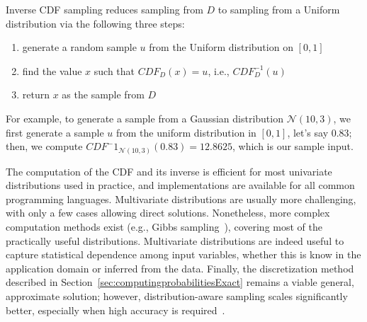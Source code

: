 Inverse CDF sampling reduces sampling from $D$ to sampling from a Uniform distribution via the following three steps:

\begin{enumerate}
	\item generate a random sample $u$ from the Uniform distribution on $[0,1]$
	\item find the value $x$ such that $CDF_D(x)=u$, i.e., $CDF_D^{-1}(u)$
	\item return $x$ as the sample from $D$
\end{enumerate}

For example, to generate a sample from a Gaussian distribution $\mathcal{N}(10, 3)$, we first generate a sample $u$ from the uniform distribution in $[0,1]$, let's say 0.83; then, we compute $CDF^-1_{\mathcal{N}(10,3)}(0.83)=12.8625$, which is our sample input.

The computation of the CDF and its inverse is efficient for most univariate distributions used in practice, and implementations are available for all common programming languages. Multivariate distributions are usually more challenging, with only a few cases allowing direct solutions. Nonetheless, more complex computation methods exist (e.g., Gibbs sampling~\cite{Robert2005MCBook}), covering most of the practically useful distributions. Multivariate distributions are indeed useful to capture statistical dependence among input variables, whether this is know in the application domain or inferred from the data. Finally, the discretization method described in Section~\ref{sec:computingprobabilitiesExact} remains a viable general, approximate solution; however, distribution-aware sampling scales significantly better, especially when high accuracy is required~\cite{2015-fse-qcoral}.




